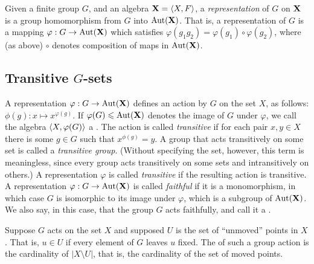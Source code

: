 



Given a finite group $G$, and an algebra $\mathbf{X} = \langle X, F\rangle$, a
%
\emph{representation} of $G$ on $\mathbf{X}$ is a group homomorphism
from $G$ into $\operatorname{Aut}(\mathbf{X})$.  That is, a representation of $G$ is a mapping
$\varphi : G \rightarrow \operatorname{Aut}(\mathbf{X})$ which satisfies $\varphi(g_1 g_2) =
\varphi(g_1) \circ \varphi(g_2)$, where (as above) $\circ$ denotes composition
of maps in $\operatorname{Aut}(\mathbf{X})$.

\subsection{Transitive $G$-sets}
A representation $\varphi : G \rightarrow \operatorname{Aut}(\mathbf{X})$ defines an action by $G$ on the
set $X$, as follows: $\phi(g): x \mapsto x^{\varphi(g)}$.  If $\varphi(G) \leqslant
\operatorname{Aut}(\mathbf{X})$
denotes the image of $G$ under $\varphi$, we call the algebra $\langle X, \varphi(G)\rangle$
a .
The action is called
%
\emph{transitive} if for each pair $x, y \in X$ there is some $g\in
G$ such that $x^{\phi(g)} = y$. 
A group that acts transitively on some set is called a 
%
\emph{transitive group}.
(Without specifying the set, however, this term is meaningless, since
every group acts transitively on some sets and intransitively on others.)
A representation $\varphi$ is called \emph{transitive} if the resulting action
is transitive. 
A representation  $\varphi : G \rightarrow \operatorname{Aut}(\mathbf{X})$ is called 
\emph{faithful}
%
if it is a monomorphism, in which case $G$ is isomorphic to its image under
$\varphi$, which is a subgroup of $\operatorname{Aut}(\mathbf{X})$.  We also say, in this case, that
the group $G$ acts faithfully, and call it a .

Suppose $G$ acts on the set $X$ and supposed $U$ is the set of ``unmoved''
points in $X$.  That is, $u\in U$ if every element of $G$ leaves $u$ fixed.
The  of such a group action is the cardinality of
$|X\setminus U|$, that is, the cardinality of the set of moved points.

